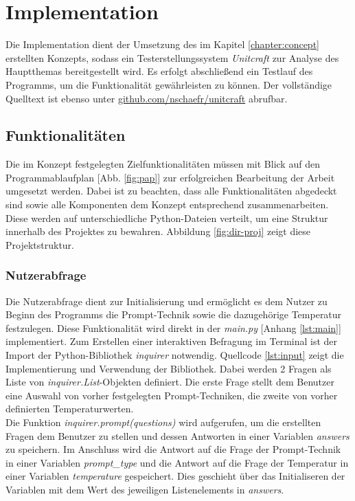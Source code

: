 \chapter{Implementation}\label{chapter:impl}
Die Implementation dient der Umsetzung des im Kapitel \ref{chapter:concept} erstellten Konzepts, sodass ein Testerstellungssystem \textit{Unitcraft} zur Analyse des Hauptthemas bereitgestellt wird. Es erfolgt abschließend ein Testlauf des Programms, um die Funktionalität gewährleisten zu können. Der vollständige Quelltext ist ebenso unter \href{https://github.com/nschaefr/unitcraft}{github.com/nschaefr/unitcraft} abrufbar.

\section{Funktionalitäten}
Die im Konzept festgelegten Zielfunktionalitäten müssen mit Blick auf den Programmablaufplan [Abb. \ref{fig:pap}] zur erfolgreichen Bearbeitung der Arbeit umgesetzt werden. Dabei ist zu beachten, dass alle Funktionalitäten abgedeckt sind sowie alle Komponenten dem Konzept entsprechend zusammenarbeiten. Diese werden auf unterschiedliche Python-Dateien verteilt, um eine Struktur innerhalb des Projektes zu bewahren. Abbildung \ref{fig:dir-proj} zeigt diese Projektstruktur.

\subsection{Nutzerabfrage}
Die Nutzerabfrage dient zur Initialisierung und ermöglicht es dem Nutzer zu Beginn des Programms die Prompt-Technik sowie die dazugehörige Temperatur festzulegen. Diese Funktionalität wird direkt in der \textit{main.py} [Anhang \ref{lst:main}] implementiert. Zum Erstellen einer interaktiven Befragung im Terminal ist der Import der Python-Bibliothek \textit{inquirer} notwendig. Quellcode \ref{lst:input} zeigt die Implementierung und Verwendung der Bibliothek. Dabei werden 2 Fragen als Liste von \textit{inquirer.List}-Objekten definiert. Die erste Frage stellt dem Benutzer eine Auswahl von vorher festgelegten Prompt-Techniken, die zweite von vorher definierten Temperaturwerten.\\
\vspace{-.3cm}
Die Funktion \textit{inquirer.prompt(questions)} wird aufgerufen, um die erstellten Fragen dem Benutzer zu stellen und dessen Antworten in einer Variablen \textit{answers} zu speichern. Im Anschluss wird die Antwort auf die Frage der Prompt-Technik in einer Variablen \textit{prompt\_type} und die Antwort auf die Frage der Temperatur in einer Variablen \textit{temperature} gespeichert. Dies geschieht über das Initialiseren der Variablen mit dem Wert des jeweiligen Listenelements in \textit{answers}.

